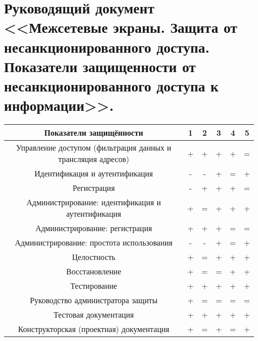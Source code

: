 \section{Руководящий документ <<Межсетевые экраны. Защита от несанкционированного доступа. Показатели защищенности от несанкционированного доступа к информации>>.}

\begin{table*}[!hb]
	\begin{tabular}{|c|c|c|c|c|c|}
		\hline
		Показатели защищённости & 1 &2 &3 &4 &5 \\ \hline
		Управление доступом (фильтрация данных и трансляция адресов) & + & + & + & + & = \\ \hline 
		Идентификация и аутентификация & - & - & + & = & + \\ \hline
		Регистрация & - & + & + & + & = \\ \hline
		Администрирование: идентификация и аутентификация & + & = & + & + & + \\ \hline
		Администрирование: регистрация & + & + & + & = & = \\ \hline
		Администрирование: простота использования & - & - & + & = & + \\ \hline
		Целостность & + & = & + & + & + \\ \hline
		Восстановление & + & = & = & + & + \\ \hline
		Тестирование & + & + & + & + & + \\ \hline
		Руководство администратора защиты  & + & = & = & = & = \\ \hline
		Тестовая документация  & +  & + & + & + & + \\ \hline
		Конструкторская (проектная) документация & + & = & + & = & + \\ \hline
	\end{tabular}
\end{table*}